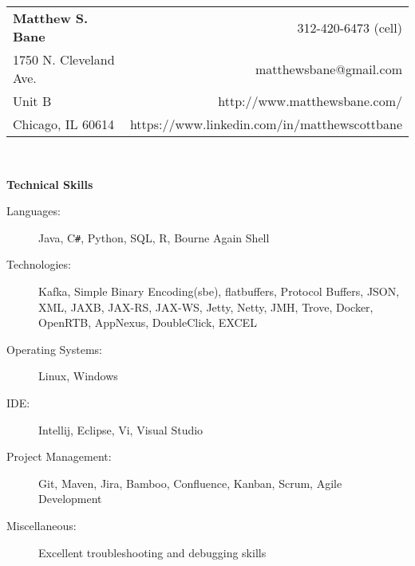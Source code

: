 \documentclass[letterpaper,10pt]{article}
\newcommand{\resheading}[1]{{\large \colorbox{mygrey}{\begin{minipage}{\textwidth}{\textbf{#1 \vphantom{p\^{E}}}}\end{minipage}}}}
\begin{document}
\begin{tabular*}{7.5in}{l@{\extracolsep{\fill}}r}
\textbf{\large Matthew S. Bane}  & 312-420-6473 (cell)\\
1750 N. Cleveland Ave. &  matthewsbane@gmail.com \\
Unit B & http://www.matthewsbane.com/\\
Chicago, IL 60614 & https://www.linkedin.com/in/matthewscottbane
\end{tabular*}
\\

\vspace{0.1in}

\resheading{Technical Skills}

\begin{description}
\item[Languages:]
Java, C{}\verb!#!, Python, SQL, R, Bourne Again Shell
\item[Technologies:]
Kafka, Simple Binary Encoding(sbe), flatbuffers, Protocol Buffers, JSON, XML, JAXB, JAX-RS, JAX-WS, Jetty, Netty, JMH, Trove, Docker, OpenRTB, AppNexus, DoubleClick, EXCEL
\item[Operating Systems:]
Linux, Windows
\item[IDE:]
Intellij, Eclipse, Vi, Visual Studio
\item[Project Management:]
Git, Maven, Jira, Bamboo, Confluence, Kanban, Scrum, Agile Development
\item[Miscellaneous:]
Excellent troubleshooting and debugging skills
\end{description}
\end{document}
